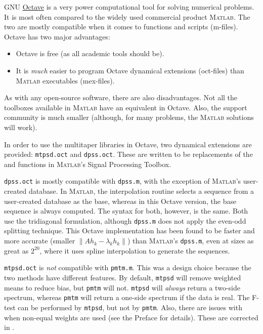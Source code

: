 
GNU \href{http://www.gnu.org/software/octave/}{Octave} is a very power computational tool for solving numerical problems.  It is most often compared to the widely used commercial product \textsc{Matlab}.  The two are mostly compatible when it comes to functions and scripts (m-files).  Octave has two major advantages:
\begin{itemize}
    \item Octave is free (as all academic tools should be).
    \item It is \emph{much} easier to program Octave dynamical extensions (oct-files) than \textsc{Matlab} executables (mex-files).
\end{itemize}
As with any open-source software, there are also disadvantages.  Not all the toolboxes available in \textsc{Matlab} have an equivalent in Octave.  Also, the support community is much smaller (although, for many problems, the \textsc{Matlab} solutions will work).

In order to use the multitaper libraries in Octave, two dynamical extensions are provided: \texttt{mtpsd.oct} and \texttt{dpss.oct}.  These are written to be replacements of the  and  functions in \textsc{Matlab}'s Signal Processing Toolbox.  

\texttt{dpss.oct} is mostly compatible with \texttt{dpss.m}, with the exception of \textsc{Matlab}'s user-created database.  In \textsc{Matlab}, the interpolation routine selects a sequence from a user-created database as the base, whereas in this Octave version, the base sequence is always computed.  The syntax for both, however, is the same.  Both use the tridiagonal formulation, although \texttt{dpss.m} does not apply the even-odd splitting technique.  This Octave implementation has been found to be faster and more accurate (smaller $\|Ah_k-\lambda_kh_k\|$) than \textsc{Matlab}'s \texttt{dpss.m}, even at sizes as great as $2^{20}$, where it uses spline interpolation to generate the sequences.

\texttt{mtpsd.oct} is \emph{not} compatible with \texttt{pmtm.m}.  This was a design choice because the two methods have different features.  By default, \texttt{mtpsd} will remove weighted means to reduce bias, but \texttt{pmtm} will not.  \texttt{mtpsd} will \emph{always} return a two-side spectrum, whereas \texttt{pmtm} will return a one-side spectrum if the data is real.  The F-test can be performed by \texttt{mtpsd}, but not by \texttt{pmtm}.  Also, there are issues with  when non-equal weights are used (see the Preface for details).  These are corrected in .

